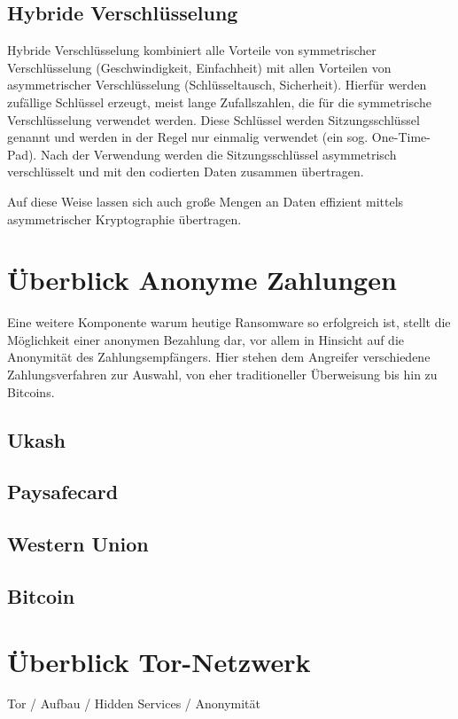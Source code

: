 \subsection{Hybride Verschlüsselung}
\label{sec:hybride_verschl}

Hybride Verschlüsselung kombiniert alle Vorteile von symmetrischer Verschlüsselung (Geschwindigkeit, Einfachheit) mit allen Vorteilen von asymmetrischer Verschlüsselung (Schlüsseltausch, Sicherheit). 
Hierfür werden zufällige Schlüssel erzeugt, meist lange Zufallszahlen, die für die symmetrische Verschlüsselung verwendet werden. Diese Schlüssel werden Sitzungsschlüssel genannt und werden in der Regel nur einmalig verwendet (ein sog. One-Time-Pad). Nach der Verwendung werden die Sitzungsschlüssel asymmetrisch verschlüsselt und mit den codierten Daten zusammen übertragen.

Auf diese Weise lassen sich auch große Mengen an Daten effizient mittels asymmetrischer Kryptographie übertragen. 




\section{Überblick Anonyme Zahlungen}
Eine weitere Komponente warum heutige Ransomware so erfolgreich ist, stellt die Möglichkeit einer anonymen Bezahlung dar, vor allem in Hinsicht auf die Anonymität des Zahlungsempfängers. Hier stehen dem Angreifer verschiedene Zahlungsverfahren zur Auswahl, von eher traditioneller Überweisung bis hin zu Bitcoins.

\subsection{Ukash}
\subsection{Paysafecard}
\subsection{Western Union}
\subsection{Bitcoin}

\section{Überblick Tor-Netzwerk}
	Tor / Aufbau / Hidden Services / Anonymität


